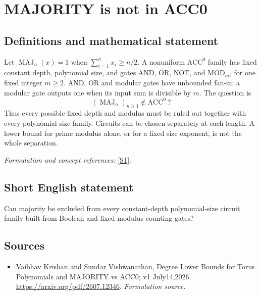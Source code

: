 \documentclass[11pt]{article}
\begin{document}
\section*{\texorpdfstring{MAJORITY is not in ACC0}{MAJORITY is not in ACC0}}\label{266}
\subsection{Definitions and mathematical statement}
Let $\operatorname{MAJ}_n(x)=1$ when $\sum_{i=1}^n x_i\ge n/2$. A nonuniform $\mathrm{ACC}^0$ family has fixed constant depth, polynomial size, and gates AND, OR, NOT, and $\mathrm{MOD}_m$, for one fixed integer $m\ge2$. AND, OR and modular gates have unbounded fan-in; a modular gate outputs one when its input sum is divisible by $m$. The question is
\[
 (\operatorname{MAJ}_n)_{n\ge1}\notin\mathrm{ACC}^0\ ?
\]
Thus every possible fixed depth and modulus must be ruled out together with every polynomial-size family. Circuits can be chosen separately at each length. A lower bound for prime modulus alone, or for a fixed size exponent, is not the whole separation.
\par\smallskip\textit{Formulation and concept references:} \href{https://arxiv.org/pdf/2607.12346}{[S1]}.

\subsection{Short English statement}
Can majority be excluded from every constant-depth polynomial-size circuit family built from Boolean and fixed-modulus counting gates?
\subsection{Sources}
\begin{itemize}
\item[S1]Vaibhav Krishan and Sundar Vishwanathan, Degree Lower Bounds for Torus Polynomials and MAJORITY vs ACC0; v1 July14,2026.
\url{https://arxiv.org/pdf/2607.12346}.
\textit{Formulation source.}
\end{itemize}
\end{document}
